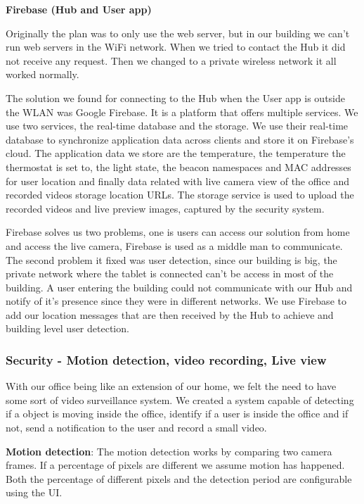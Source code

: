 \documentclass[conference]{IEEEtran}
\begin{document}
\textbf{Firebase (Hub and User app)}

Originally the plan was to only use the web server, but in our building we can't run web servers in the WiFi network. When we tried to contact the Hub it did not receive any request. Then we changed to a private wireless network it all worked normally.

The solution we found for connecting  to the Hub when the User app is outside the \ac{WLAN} was Google Firebase. It is a platform that offers multiple services. We use two services, the real-time database and the storage.
We use their real-time database to synchronize application data across clients and store it on Firebase's cloud. The application data we store are the temperature, the temperature the thermostat is set to, the light state, the beacon namespaces and MAC addresses for user location and finally data related with live camera view of the office and recorded videos storage location URLs. The storage service is used to upload the recorded videos and live preview images, captured by the security system.

Firebase solves us two problems, one is users can access our solution from home and access the live camera, Firebase is used as a middle man to communicate. The second problem it fixed was user detection, since our building is big, the private network where the tablet is connected can't be access in most of the building. A user entering the building could not communicate with our Hub and notify of it's presence since they were in different networks. We use Firebase to add our location messages that are then received by the Hub to achieve and building level user detection.

\subsubsection{Security - Motion detection, video recording, Live view}\label{imp:security_motion}

With our office being like an extension of our home, we felt the need to have some sort of video surveillance system. We created a system capable of detecting if a object is moving inside the office, identify if a user is inside the office and if not, send a notification to the user and record a small video.

\textbf{Motion detection}: The motion detection works by comparing two camera frames. If a percentage of pixels are different we assume motion has happened. Both the percentage of different pixels and the detection period are configurable using the \ac{UI}.
\end{document}
